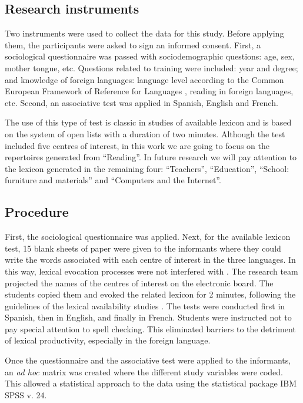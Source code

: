 \documentclass[english]{textolivre}
\begin{document}
\subsection{Research instruments}\label{sec-fmt-manuscrito}
Two instruments were used to collect the data for this study. Before applying them, the participants were asked to sign an informed consent. First, a sociological questionnaire was passed with sociodemographic questions: age, sex, mother tongue, etc. Questions related to training were included: year and degree; and knowledge of foreign languages: language level according to the Common European Framework of Reference for Languages \cite{consejo_de_europa_marco_2002}, reading in foreign languages, etc. Second, an associative test was applied in Spanish, English and French. 

The use of this type of test is classic in studies of available lexicon and is based on the system of open lists with a duration of two minutes. Although the test included five centres of interest, in this work we are going to focus on the repertoires generated from “Reading”. In future research we will pay attention to the lexicon generated in the remaining four: “Teachers”, “Education”, “School: furniture and materials” and “Computers and the Internet”.

\subsection{Procedure}\label{sec-formato}
First, the sociological questionnaire was applied. Next, for the available lexicon test, 15 blank sheets of paper were given to the informants where they could write the words associated with each centre of interest in the three languages. In this way, lexical evocation processes were not interfered with \cite{santos_diaz_activacion_2020,santos_diaz_concepto_2022}. The research team projected the names of the centres of interest on the electronic board. The students copied them and evoked the related lexicon for 2 minutes, following the guidelines of the lexical availability studies \cite{lopez_gonzalez_disponibilidad_2014}. The tests were conducted first in Spanish, then in English, and finally in French. Students were instructed not to pay special attention to spell checking. This eliminated barriers to the detriment of lexical productivity, especially in the foreign language.

Once the questionnaire and the associative test were applied to the informants, an \textit{ad hoc} matrix was created where the different study variables were coded. This allowed a statistical approach to the data using the statistical package IBM SPSS v. 24.
\end{document}
